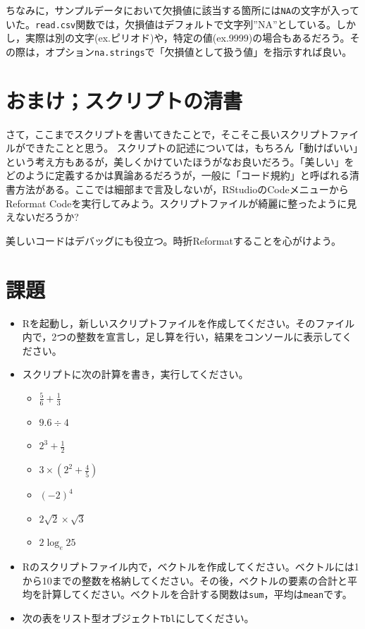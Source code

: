 \documentclass[
  a4paper,
]{ltjsbook}
\providecommand{\tightlist}{%
  \setlength{\itemsep}{0pt}\setlength{\parskip}{0pt}}\usepackage{longtable,booktabs,array}
\begin{document}
ちなみに，サンプルデータにおいて欠損値に該当する箇所には\texttt{NA}の文字が入っていた。\texttt{read.csv}関数では，欠損値はデフォルトで文字列''NA''としている。しかし，実際は別の文字(ex.ピリオド)や，特定の値(ex.9999)の場合もあるだろう。その際は，オプション\texttt{na.strings}で「欠損値として扱う値」を指示すれば良い。

\section{おまけ；スクリプトの清書}\label{ux304aux307eux3051ux30b9ux30afux30eaux30d7ux30c8ux306eux6e05ux66f8}

さて，ここまでスクリプトを書いてきたことで，そこそこ長いスクリプトファイルができたことと思う。
スクリプトの記述については，もちろん「動けばいい」という考え方もあるが，美しくかけていたほうがなお良いだろう。「美しい」をどのように定義するかは異論あるだろうが，一般に「コード規約」と呼ばれる清書方法がある。ここでは細部まで言及しないが，RStudioのCodeメニューからReformat
Codeを実行してみよう。スクリプトファイルが綺麗に整ったように見えないだろうか?

美しいコードはデバッグにも役立つ。時折Reformatすることを心がけよう。

\section{課題}\label{ux8ab2ux984c-1}

\begin{itemize}
\item
  Rを起動し，新しいスクリプトファイルを作成してください。そのファイル内で，2つの整数を宣言し，足し算を行い，結果をコンソールに表示してください。
\item
  スクリプトに次の計算を書き，実行してください。

  \begin{itemize}
  \tightlist
  \item
    \(\frac{5}{6} + \frac{1}{3}\)
  \item
    \(9.6 \div 4\)
  \item
    \(2^3 + \frac{1}{2}\)
  \item
    \(3\times (2^2 + \frac{4}{5})\)
  \item
    \((-2)^4\)
  \item
    \(2\sqrt{2} \times \sqrt{3}\)
  \item
    \(2\log_e 25\)
  \end{itemize}
\item
  Rのスクリプトファイル内で，ベクトルを作成してください。ベクトルには1から10までの整数を格納してください。その後，ベクトルの要素の合計と平均を計算してください。ベクトルを合計する関数は\texttt{sum}，平均は\texttt{mean}です。
\item
  次の表をリスト型オブジェクト\texttt{Tbl}にしてください。
\end{itemize}
\end{document}
